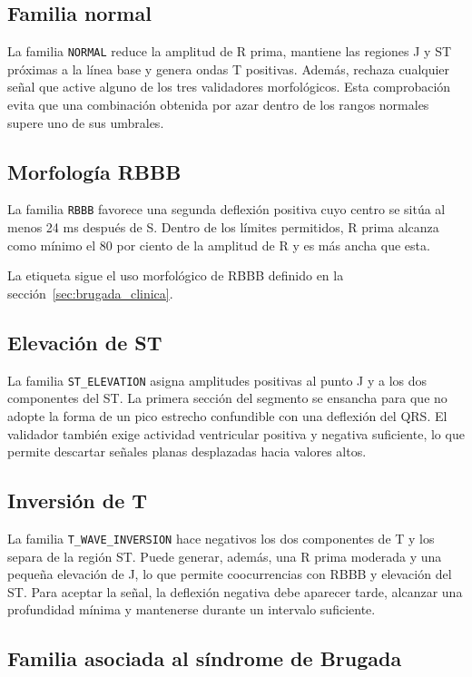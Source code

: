 \subsection{Familia normal}

La familia \texttt{NORMAL} reduce la amplitud de R prima, mantiene las regiones J y ST próximas a la línea base y genera ondas T positivas. Además, rechaza cualquier señal que active alguno de los tres validadores morfológicos. Esta comprobación evita que una combinación obtenida por azar dentro de los rangos normales supere uno de sus umbrales.

\subsection{Morfología RBBB}

La familia \texttt{RBBB} favorece una segunda deflexión positiva cuyo centro se sitúa al menos 24 ms después de S. Dentro de los límites permitidos, R prima alcanza como mínimo el 80 por ciento de la amplitud de R y es más ancha que esta.

La etiqueta sigue el uso morfológico de RBBB definido en la sección~\ref{sec:brugada_clinica}.

\subsection{Elevación de ST}

La familia \texttt{ST\_ELEVATION} asigna amplitudes positivas al punto J y a los dos componentes del ST. La primera sección del segmento se ensancha para que no adopte la forma de un pico estrecho confundible con una deflexión del QRS. El validador también exige actividad ventricular positiva y negativa suficiente, lo que permite descartar señales planas desplazadas hacia valores altos.

\subsection{Inversión de T}

La familia \texttt{T\_WAVE\_INVERSION} hace negativos los dos componentes de T y los separa de la región ST. Puede generar, además, una R prima moderada y una pequeña elevación de J, lo que permite coocurrencias con RBBB y elevación del ST. Para aceptar la señal, la deflexión negativa debe aparecer tarde, alcanzar una profundidad mínima y mantenerse durante un intervalo suficiente.

\subsection{Familia asociada al síndrome de Brugada}


